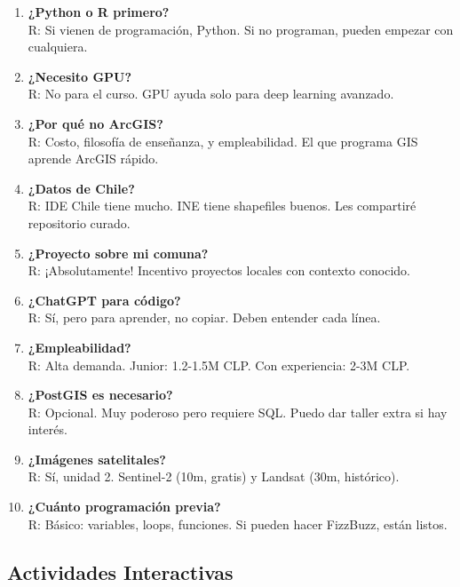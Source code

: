 \documentclass[11pt,a4paper]{article}
\begin{document}
\begin{enumerate}
\item \textbf{¿Python o R primero?}\\
R: Si vienen de programación, Python. Si no programan, pueden empezar con cualquiera.

\item \textbf{¿Necesito GPU?}\\
R: No para el curso. GPU ayuda solo para deep learning avanzado.

\item \textbf{¿Por qué no ArcGIS?}\\
R: Costo, filosofía de enseñanza, y empleabilidad. El que programa GIS aprende ArcGIS rápido.

\item \textbf{¿Datos de Chile?}\\
R: IDE Chile tiene mucho. INE tiene shapefiles buenos. Les compartiré repositorio curado.

\item \textbf{¿Proyecto sobre mi comuna?}\\
R: ¡Absolutamente! Incentivo proyectos locales con contexto conocido.

\item \textbf{¿ChatGPT para código?}\\
R: Sí, pero para aprender, no copiar. Deben entender cada línea.

\item \textbf{¿Empleabilidad?}\\
R: Alta demanda. Junior: 1.2-1.5M CLP. Con experiencia: 2-3M CLP.

\item \textbf{¿PostGIS es necesario?}\\
R: Opcional. Muy poderoso pero requiere SQL. Puedo dar taller extra si hay interés.

\item \textbf{¿Imágenes satelitales?}\\
R: Sí, unidad 2. Sentinel-2 (10m, gratis) y Landsat (30m, histórico).

\item \textbf{¿Cuánto programación previa?}\\
R: Básico: variables, loops, funciones. Si pueden hacer FizzBuzz, están listos.
\end{enumerate}

\subsection{Actividades Interactivas}
\end{document}
